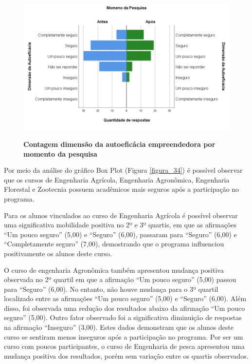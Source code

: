 \begin{figure}[H]
\centering
\caption{\textbf{
Contagem dimensão da autoeficácia empreendedora  por momento da pesquisa}}
\includegraphics[scale=0.5]{Imagens/dimensao_autoeficacia.png}
\label{figura_autoeficacia}
\end{figure}


Por meio da análise do gráfico Box Plot (Figura \ref{figura_34}) é possível observar que os cursos de Engenharia Agrícola, Engenharia Agronômica, Engenharia Florestal e Zootecnia possuem acadêmicos mais seguros após a participação no programa.

Para os alunos vinculados ao curso de Engenharia Agrícola é possível observar uma significativa mobilidade positiva no 2º e 3º quartis, em que as afirmações “Um pouco seguro” (5,00) e “Seguro” (6,00), passaram para “Seguro” (6,00) e “Completamente seguro” (7,00), demostrando que o programa influenciou positivamente os alunos deste curso.  

O curso de engenharia Agronômica também apresentou mudança positiva observada no 2º quartil em que a afirmação “Um pouco seguro” (5,00) passou para “Seguro” (6,00). No entanto, não houve mudança para o 3º quartil localizado entre as afirmações “Um pouco seguro” (5,00) e “Seguro” (6,00). Além disso, foi observada uma redução dos resultados abaixo da afirmação “Um pouco seguro” (5,00). Outro fator observado foi a significativa diminuição de respostas na afirmação “Inseguro” (3,00). Estes dados demonstram que os alunos deste curso se sentiram menos inseguros após a participação no programa.
Por ser um curso com poucos participantes, o curso de Engenharia de pesca apresentou uma mudança positiva dos resultados, porém sem variação entre os quartis observados.

